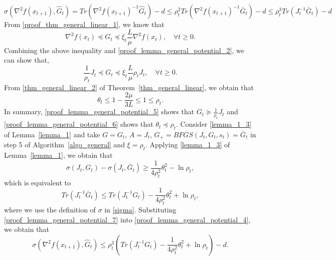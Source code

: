 \documentclass[11pt]{article}
\numberwithin{assumption}{section}
\numberwithin{remark}{section}
\numberwithin{theorem}{section}
\begin{document}
\begin{equation}\label{proof_lemma_general_potential_4}
    \sigma(\nabla^2{f(x_{t + 1})}, \hat{G}_t) = Tr(\nabla^2{f(x_{t + 1})}^{-1}\hat{G}_t) - d \leq \rho_t^2 Tr(\nabla^2{f(x_{t + 1})}^{-1}\bar{G}_t) - d \leq \rho_t^3 Tr(J_t^{-1}\bar{G}_t) - d
\end{equation}
From \eqref{proof_thm_general_linear_1}, we know that
\begin{equation}
\nabla^2{f(x_t)} \preceq G_t \preceq \xi_t \frac{L}{\mu}\nabla^2{f(x_t)}, \quad \forall t \geq 0.
\end{equation}
Combining the above inequality and \eqref{proof_lemma_general_potential_2}, we can show that,
\begin{equation}\label{proof_lemma_general_potential_5}
    \frac{1}{\rho_t}J_t \preceq G_t \preceq \xi_t\frac{L}{\mu}\rho_t J_t, \quad \forall t \geq 0.
\end{equation}
From \eqref{thm_general_linear_2} of Theorem~\ref{thm_general_linear}, we obtain that
\begin{equation}\label{proof_lemma_general_potential_6}
    \theta_t \leq 1- \frac{2\mu}{3L} \leq 1 \leq \rho_t.
\end{equation}
In summary, \eqref{proof_lemma_general_potential_5} shows that $G_t \succeq \frac{1}{\rho_t}J_t$ and \eqref{proof_lemma_general_potential_6} shows that $\theta_t \preceq \rho_t$. Consider \eqref{lemma_1_3} of Lemma~\ref{lemma_1} and take $G = G_t$, $A = J_t$, $G_{+} = BFGS(J_t, G_t, s_t) = \bar{G}_t$ in step 5 of Algorithm~\ref{algo_general} and $\xi = \rho_t$. Applying \eqref{lemma_1_3} of Lemma~\ref{lemma_1}, we obtain that
\begin{equation}
    \sigma(J_t, G_t) - \sigma(J_t, \bar{G}_t) \geq \frac{1}{4\rho_t^2}\theta_t^2 - \ln{\rho_t},
\end{equation}
which is equivalent to
\begin{equation}\label{proof_lemma_general_potential_7}
    Tr(J_t^{-1}\bar{G}_t) \leq Tr(J_t^{-1}G_t) - \frac{1}{4\rho_t^2}\theta_t^2 + \ln{\rho_t},
\end{equation}
where we use the definition of $\sigma$ in \eqref{sigma}. Substituting \eqref{proof_lemma_general_potential_7} into \eqref{proof_lemma_general_potential_4}, we obtain that
\begin{equation}\label{proof_lemma_general_potential_8}
    \sigma(\nabla^2{f(x_{t + 1})}, \hat{G}_t) \leq \rho_t^3 \left(Tr(J_t^{-1}G_t) - \frac{1}{4\rho_t^2}\theta_t^2 + \ln{\rho_t}\right) - d.
\end{equation}
\end{document}
